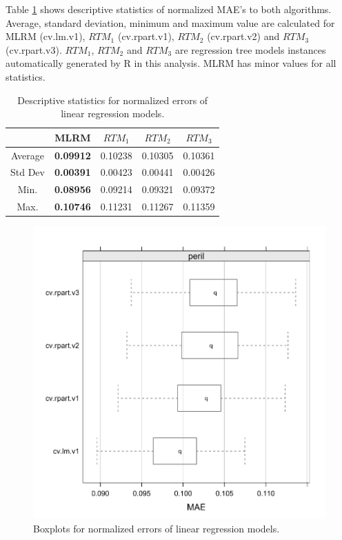 \documentclass[a4paper,twoside]{article}
\begin{document}
Table \ref{tab:lm_descriptive} shows descriptive statistics of normalized MAE's to both algorithms. Average, standard deviation, minimum and maximum value are calculated for MLRM (cv.lm.v1), $RTM_1$ (cv.rpart.v1), $RTM_2$ (cv.rpart.v2) and $RTM_3$ (cv.rpart.v3). $RTM_1$, $RTM_2$ and $RTM_3$ are regression tree models instances automatically generated by R in this analysis. MLRM has minor values for all statistics.

\begin{table}[h]
\caption{Descriptive statistics for normalized errors of linear regression models.}\label{tab:lm_descriptive} \centering
\begin{tabular}{|c|c|c|c|c|}
  \hline
   & MLRM & $RTM_1$ & $RTM_2$ & $RTM_3$ \\
  \hline
  Average & \textbf{0.09912} & 0.10238 & 0.10305 & 0.10361  \\
  \hline
  Std Dev & \textbf{0.00391} & 0.00423 & 0.00441 & 0.00426  \\
  \hline
  Min. & \textbf{0.08956} & 0.09214 & 0.09321 & 0.09372  \\
  \hline
  Max. & \textbf{0.10746} & 0.11231 & 0.11267 & 0.11359  \\
  \hline
\end{tabular}
\end{table}

\begin{figure}[!h]
  \vspace{-0.2cm}
  \centering
  \includegraphics[width=\columnwidth]{images/mlrm_result_peril.pdf}
  \caption{Boxplots for normalized errors of linear regression models.}
  \label{fig:mlrm_result}
\end{figure}
\end{document}
